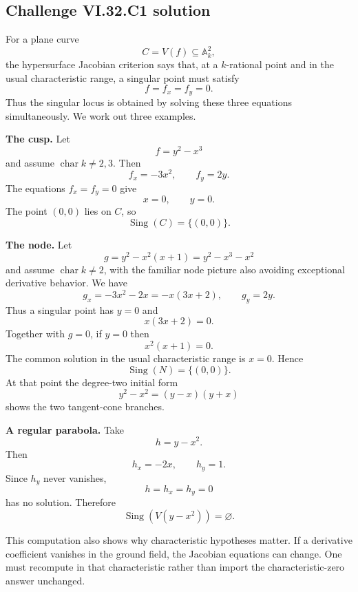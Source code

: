 
\subsection*{Challenge VI.32.C1 solution}
\begin{solution}
For a plane curve
\[
C=V(f)\subseteq\mathbb A^2_k,
\]
the hypersurface Jacobian criterion says that, at a \(k\)-rational point and in the usual characteristic range,
a singular point must satisfy
\[
f=f_x=f_y=0.
\]
Thus the singular locus is obtained by solving these three equations simultaneously.  We work out three examples.

\textbf{The cusp.}
Let
\[
f=y^2-x^3
\]
and assume \(\operatorname{char}k\ne2,3\). Then
\[
f_x=-3x^2,
\qquad
f_y=2y.
\]
The equations \(f_x=f_y=0\) give
\[
x=0,\qquad y=0.
\]
The point \((0,0)\) lies on \(C\), so
\[
\boxed{\operatorname{Sing}(C)=\{(0,0)\}}.
\]

\textbf{The node.}
Let
\[
g=y^2-x^2(x+1)
=
y^2-x^3-x^2
\]
and assume \(\operatorname{char}k\ne2\), with the familiar node picture also avoiding exceptional derivative
behavior. We have
\[
g_x=-3x^2-2x=-x(3x+2),
\qquad
g_y=2y.
\]
Thus a singular point has \(y=0\) and
\[
x(3x+2)=0.
\]
Together with \(g=0\), if \(y=0\) then
\[
x^2(x+1)=0.
\]
The common solution in the usual characteristic range is \(x=0\). Hence
\[
\boxed{\operatorname{Sing}(N)=\{(0,0)\}}.
\]
At that point the degree-two initial form
\[
y^2-x^2=(y-x)(y+x)
\]
shows the two tangent-cone branches.

\textbf{A regular parabola.}
Take
\[
h=y-x^2.
\]
Then
\[
h_x=-2x,
\qquad
h_y=1.
\]
Since \(h_y\) never vanishes,
\[
h=h_x=h_y=0
\]
has no solution. Therefore
\[
\boxed{\operatorname{Sing}(V(y-x^2))=\varnothing}.
\]

This computation also shows why characteristic hypotheses matter.  If a derivative coefficient vanishes in the
ground field, the Jacobian equations can change.  One must recompute in that characteristic rather than import the
characteristic-zero answer unchanged.
\end{solution}

